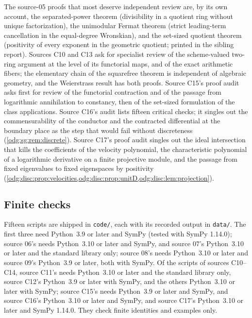 \documentclass[11pt,oneside]{article}
\numberwithin{equation}{section}
\theoremstyle{definition}
\theoremstyle{remark}
\newcommand{\fn}[1]{\nolinkurl{#1}}
\begin{document}
The source-05 proofs that most deserve independent review are, by its own
account, the separated-power theorem (divisibility in a quotient ring without
unique factorization), the unimodular Fermat theorem (strict leading-term
cancellation in the equal-degree Wronskian), and the set-sized quotient
theorem (positivity of every exponent in the geometric quotient; printed in
the sibling report). Sources C10 and C13 ask for specialist review of the
scheme-valued two-ring argument at the level of its functorial maps, and of the exact
arithmetic fibers; the elementary chain of the squarefree theorem is independent of
algebraic geometry, and the Weierstrass result has both proofs. Source C15's proof audit
asks first for review of the functorial contraction and of the passage from logarithmic
annihilation to constancy, then of the set-sized formulation of the class applications. Source C16's audit lists fifteen critical checks; it singles out the commensurability of
the conductor and the contracted differential at the boundary place as the step that would
fail without discreteness (\cref{odg:sg:rem:discrete}).
Source C17's proof audit singles out the ideal intersection that kills the coefficients of
the velocity polynomial, the characteristic polynomial of a logarithmic derivative on a
finite projective module, and the passage from fixed eigenvalues to fixed eigenspaces by
positivity (\cref{odg:disc:prop:velocities,odg:disc:prop:unitD,odg:disc:lem:projection}).

\subsection{Finite checks}

Fifteen scripts are shipped in \fn{code/}, each with its recorded output in
\fn{data/}. The first three need Python~3.9 or later and SymPy (tested with
SymPy 1.14.0); source 06's needs Python~3.10 or later and SymPy, and source
07's Python~3.10 or later and the standard library only; source 08's needs
Python~3.10 or later and source 09's Python~3.9 or later, both with SymPy. Of
the scripts of sources C10--C14, source C11's needs Python~3.10 or later and the
standard library only, source C12's Python~3.9 or later with SymPy, and the others
Python~3.10 or later with SymPy; source C15's needs Python~3.9 or later and SymPy, and
source C16's Python~3.10 or later and SymPy, and source C17's Python~3.10 or later and
SymPy 1.14.0. They
check finite identities and examples only.
\end{document}
